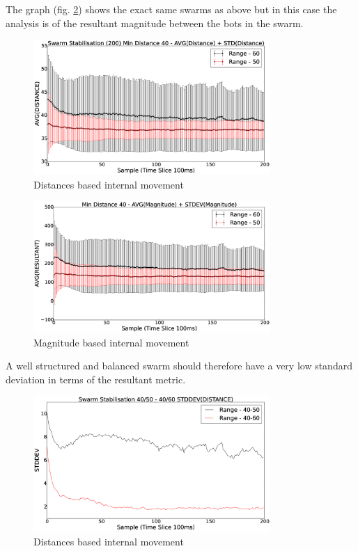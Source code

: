 \documentclass[10pt,journal,letterpaper,twoside]{IEEEtran}
\newcommand{\stability}{internal movement}
\newcommand{\Fig}{fig.}
\begin{document}
The graph (\Fig{} \ref{methods:StabilityMagnitudeSwarm40-5060}) shows
the exact same swarms as above but in this case the analysis is of the
resultant magnitude between the bots in the swarm.

\begin{figure}[H]
\begin{center}
\includegraphics[width=9cm]{figures/StabilityDistanceSwarm40-5060}
\end{center}
\caption{Distances based \stability{}\label{methods:StabilityDistanceSwarm40-5060}}
\end{figure}

\begin{figure}[H]
\begin{center}
\includegraphics[width=9cm]{figures/StabilityMagnitudeSwarm40-5060}
\end{center}
\caption{Magnitude based \stability{}\label{methods:StabilityMagnitudeSwarm40-5060}}
\end{figure}

A well structured and balanced swarm should therefore have a very low
standard deviation in terms of the resultant metric.

\begin{figure}[H]
\begin{center}
\includegraphics[width=9cm]{figures/StabilityDistanceSwarm}
\end{center}
\caption{Distances based \stability{}\label{methods:StabilityDistanceSwarm}}
\end{figure}
\end{document}
